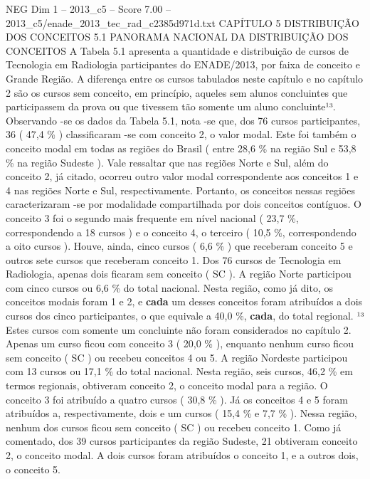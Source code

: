 \begin{textsample}{NEG Dim 1 – 2013\_c5 – Score 7.00 – 2013\_c5/enade\_2013\_tec\_rad\_c2385d971d.txt}  \label{ex:f1_neg_353}
CAPÍTULO 5 DISTRIBUIÇÃO DOS CONCEITOS 5.1 PANORAMA NACIONAL DA DISTRIBUIÇÃO DOS CONCEITOS A Tabela 5.1 apresenta a quantidade e distribuição de cursos de Tecnologia em Radiologia participantes do ENADE/2013, por faixa de conceito e Grande Região.
A diferença entre os cursos tabulados neste capítulo e no capítulo 2 são os cursos sem conceito, em princípio, aqueles sem alunos concluintes que participassem da prova ou que tivessem tão somente um aluno concluinte¹³.
Observando -se os dados da Tabela 5.1, nota -se que, dos 76 cursos participantes, 36 ( 47,4 \% ) classificaram -se com conceito 2, o valor modal.
Este foi também o conceito modal em todas as regiões do Brasil ( entre 28,6 \% na região Sul e 53,8 \% na região Sudeste ).
Vale ressaltar que nas regiões Norte e Sul, além do conceito 2, já citado, ocorreu outro valor modal correspondente aos conceitos 1 e 4 nas regiões Norte e Sul, respectivamente.
Portanto, os conceitos nessas regiões caracterizaram -se por modalidade compartilhada por dois conceitos contíguos.
O conceito 3 foi o segundo mais frequente em nível nacional ( 23,7 \%, correspondendo a 18 cursos ) e o conceito 4, o terceiro ( 10,5 \%, correspondendo a oito cursos ).
Houve, ainda, cinco cursos ( 6,6 \% ) que receberam conceito 5 e outros sete cursos que receberam conceito 1.
Dos 76 cursos de Tecnologia em Radiologia, apenas dois ficaram sem conceito ( SC ).
A região Norte participou com cinco cursos ou 6,6 \% do total nacional.
Nesta região, como já dito, os conceitos modais foram 1 e 2, e \textbf{cada} um desses conceitos foram atribuídos a dois cursos dos cinco participantes, o que equivale a 40,0 \%, \textbf{cada}, do total regional. ¹³ Estes cursos com somente um concluinte não foram considerados no capítulo 2.
Apenas um curso ficou com conceito 3 ( 20,0 \% ), enquanto nenhum curso ficou sem conceito ( SC ) ou recebeu conceitos 4 ou 5.
A região Nordeste participou com 13 cursos ou 17,1 \% do total nacional.
Nesta região, seis cursos, 46,2 \% em termos regionais, obtiveram conceito 2, o conceito modal para a região.
O conceito 3 foi atribuído a quatro cursos ( 30,8 \% ).
Já os conceitos 4 e 5 foram atribuídos a, respectivamente, dois e um cursos ( 15,4 \% e 7,7 \% ).
Nessa região, nenhum dos cursos ficou sem conceito ( SC ) ou recebeu conceito 1.
Como já comentado, dos 39 cursos participantes da região Sudeste, 21 obtiveram conceito 2, o conceito modal.
A dois cursos foram atribuídos o conceito 1, e a outros dois, o conceito 5.

\end{textsample}
